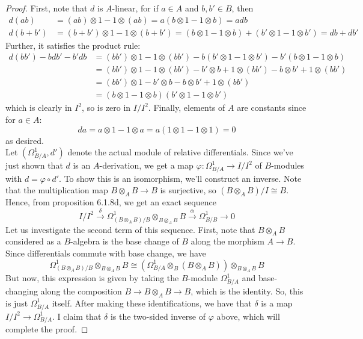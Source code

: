 \begin{proof}
	First, note that $d$ is $A$-linear, for if $a \in A$ and $b,b' \in B$, then
	\begin{align*}
		d(ab) &= (ab) \otimes 1 - 1 \otimes (ab) = a(b \otimes 1 - 1 \otimes b) = adb \\
		d(b+b') &= (b+b') \otimes 1 - 1 \otimes (b+b') = (b \otimes 1 - 1 \otimes b)+(b' \otimes 1 - 1 \otimes b') = db+db'
	\end{align*}
	Further, it satisfies the product rule:
	\begin{align*}
	d(bb')-bdb'-b'db
		&= (bb') \otimes 1 - 1 \otimes (bb') - b(b' \otimes 1 - 1 \otimes b') - b'(b \otimes 1 - 1 \otimes b) \\
		&= (bb') \otimes 1 - 1 \otimes (bb') - b' \otimes b + 1 \otimes (bb') - b \otimes b' + 1 \otimes (bb') \\
		&= (bb') \otimes 1 - b' \otimes b - b \otimes b' + 1 \otimes (bb') \\
		&= (b \otimes 1 - 1 \otimes b)(b' \otimes 1 - 1 \otimes b')
	\end{align*}
	which is clearly in $I^2$, so is zero in $I/I^2$. Finally, elements of $A$ are constants since for $a \in A$:
	\[ da = a \otimes 1 - 1 \otimes a = a(1 \otimes 1 - 1 \otimes 1) = 0 \]
	as desired. \\
	
	Let $(\Omega_{B/A}^1, d')$ denote the actual module of relative differentials. Since we've just shown that $d$ is an $A$-derivation, we get a map $\varphi : \Omega_{B/A}^1 \to I/I^2$ of $B$-modules with $d = \varphi \circ d'$. To show this is an isomorphism, we'll construct an inverse. Note that the multiplication map $B \otimes_A B \to B$ is surjective, so $(B \otimes_A B)/I \cong B$. Hence, from proposition 6.1.8d, we get an exact sequence
	\[ I/I^2 \xrightarrow{\delta} \Omega^1_{(B \otimes_A B)/B} \otimes_{B \otimes_A B} B \xrightarrow{\alpha} \Omega^1_{B/B} \to 0 \]
	Let us investigate the second term of this sequence. First, note that $B \otimes_A B$ considered as a $B$-algebra is the base change of $B$ along the morphism $A \to B$. Since differentials commute with base change, we have
	\[ \Omega^1_{(B \otimes_A B)/B} \otimes_{B \otimes_A B} B \cong (\Omega^1_{B/A} \otimes_B (B \otimes_A B)) \otimes_{B \otimes_A B} B \]
	But now, this expression is given by taking the $B$-module $\Omega^1_{B/A}$ and base-changing along the composition $B \to B \otimes_A B \to B$, which is the identity. So, this is just $\Omega^1_{B/A}$ itself. After making these identifications, we have that $\delta$ is a map $I/I^2 \to \Omega^1_{B/A}$. I claim that $\delta$ is the two-sided inverse of $\varphi$ above, which will complete the proof.
	

\end{proof}
